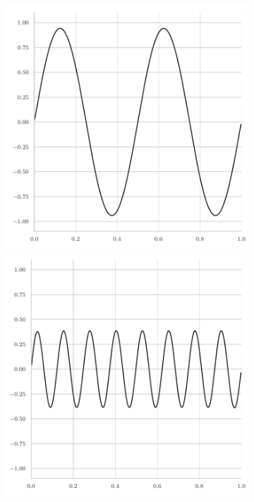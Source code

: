 \begin{figure}
\begin{subfigure}[b]{0.32\textwidth}
	\end{subfigure}
	\hfill
	\begin{subfigure}[b]{0.32\textwidth}
		\centering
		\includegraphics[width=\textwidth]{figures/final_error_gauss_seidel_4pi.pdf}
		\includegraphics[width=\textwidth]{figures/final_error_gauss_seidel_16pi.pdf}

\end{subfigure}
\end{figure}
